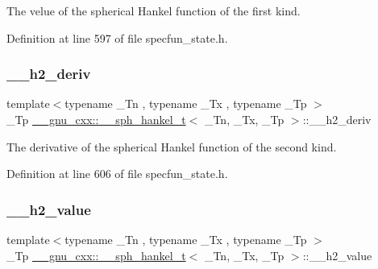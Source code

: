 The velue of the spherical Hankel function of the first kind. 



Definition at line 597 of file specfun\+\_\+state.\+h.

\mbox{\label{struct____gnu__cxx_1_1____sph__hankel__t_a7b6cbd23f269cf3b0c76d1fc21bede4d}} 
\subsubsection{\texorpdfstring{\+\_\+\+\_\+h2\+\_\+deriv}{\_\_h2\_deriv}}
{\footnotesize\ttfamily template$<$typename \+\_\+\+Tn , typename \+\_\+\+Tx , typename \+\_\+\+Tp $>$ \\
\+\_\+\+Tp \hyperlink{struct____gnu__cxx_1_1____sph__hankel__t}{\+\_\+\+\_\+gnu\+\_\+cxx\+::\+\_\+\+\_\+sph\+\_\+hankel\+\_\+t}$<$ \+\_\+\+Tn, \+\_\+\+Tx, \+\_\+\+Tp $>$\+::\+\_\+\+\_\+h2\+\_\+deriv}



The derivative of the spherical Hankel function of the second kind. 



Definition at line 606 of file specfun\+\_\+state.\+h.

\mbox{\label{struct____gnu__cxx_1_1____sph__hankel__t_a225e48ba2faafbdabd65cd173372d418}} 
\subsubsection{\texorpdfstring{\+\_\+\+\_\+h2\+\_\+value}{\_\_h2\_value}}
{\footnotesize\ttfamily template$<$typename \+\_\+\+Tn , typename \+\_\+\+Tx , typename \+\_\+\+Tp $>$ \\
\+\_\+\+Tp \hyperlink{struct____gnu__cxx_1_1____sph__hankel__t}{\+\_\+\+\_\+gnu\+\_\+cxx\+::\+\_\+\+\_\+sph\+\_\+hankel\+\_\+t}$<$ \+\_\+\+Tn, \+\_\+\+Tx, \+\_\+\+Tp $>$\+::\+\_\+\+\_\+h2\+\_\+value}



